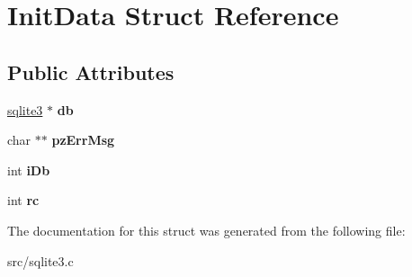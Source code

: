 \hypertarget{struct_init_data}{\section{Init\-Data Struct Reference}
\label{struct_init_data}
}
\subsection*{Public Attributes}
\begin{DoxyCompactItemize}
\item 
\hypertarget{struct_init_data_adc9e29c56e0392076e92d7f4b29fa272}{\hyperlink{structsqlite3}{sqlite3} $\ast$ {\bfseries db}}\label{struct_init_data_adc9e29c56e0392076e92d7f4b29fa272}

\item 
\hypertarget{struct_init_data_aa8aef34241ec214f038b38932ffe1357}{char $\ast$$\ast$ {\bfseries pz\-Err\-Msg}}\label{struct_init_data_aa8aef34241ec214f038b38932ffe1357}

\item 
\hypertarget{struct_init_data_ad6c7953b49d351cd9fb14e3394010689}{int {\bfseries i\-Db}}\label{struct_init_data_ad6c7953b49d351cd9fb14e3394010689}

\item 
\hypertarget{struct_init_data_a627153a3de2c4d159ae44ebc03961592}{int {\bfseries rc}}\label{struct_init_data_a627153a3de2c4d159ae44ebc03961592}

\end{DoxyCompactItemize}


The documentation for this struct was generated from the following file\-:\begin{DoxyCompactItemize}
\item 
src/sqlite3.\-c\end{DoxyCompactItemize}
